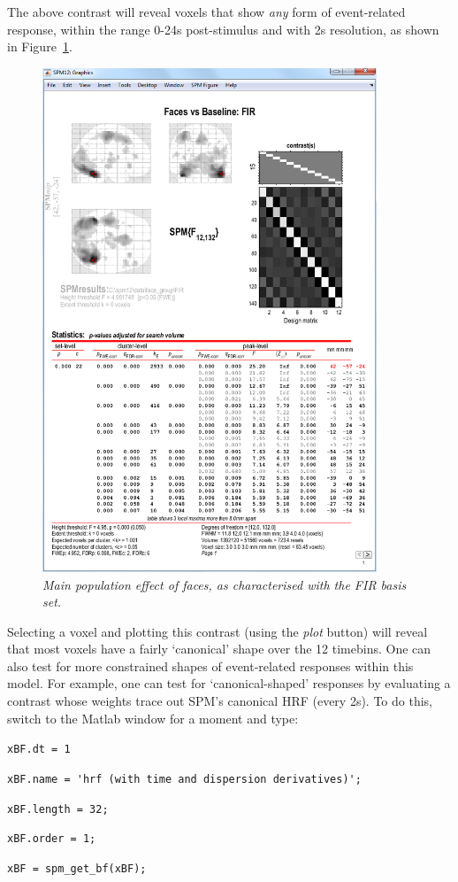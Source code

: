 The above contrast will reveal voxels that show {\em any} form of event-related response, within the range 0-24s post-stimulus and with 2s resolution, as shown in Figure~\ref{fir_results}. 
\begin{figure}
\begin{center}
\includegraphics[width=100mm]{faces_group/fir_results}
\caption{\em Main population effect of faces, as characterised with the FIR basis set. \label{fir_results}}
\end{center}
\end{figure}
Selecting a voxel and plotting this contrast (using the {\em plot} button) will reveal that most voxels have a fairly `canonical' shape over the 12 timebins.
One can also test for more constrained shapes of event-related responses within this model. For example, one can test for `canonical-shaped' responses by evaluating a contrast whose weights trace out SPM's canonical HRF (every 2s). To do this, switch to the Matlab window for a moment and type:
\bi
\item{\verb!xBF.dt = 1!}
\item{\verb!xBF.name = 'hrf (with time and dispersion derivatives)';!}
\item{\verb!xBF.length = 32;!}
\item{\verb!xBF.order = 1;!}
\item{\verb!xBF = spm_get_bf(xBF);!}
\ei

